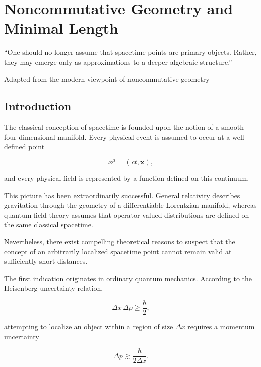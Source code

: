 
\chapter{Noncommutative Geometry and Minimal Length}

\epigraph{
``One should no longer assume that spacetime points are primary objects.
Rather, they may emerge only as approximations to a deeper algebraic
structure.''
}{Adapted from the modern viewpoint of noncommutative geometry}

\label{chap:NCG}


\section{Introduction}

The classical conception of spacetime is founded upon the notion of a smooth
four-dimensional manifold. Every physical event is assumed to occur at a
well-defined point

\[
x^\mu=(ct,\mathbf{x}),
\]

and every physical field is represented by a function defined on this
continuum.

This picture has been extraordinarily successful. General relativity describes
gravitation through the geometry of a differentiable Lorentzian manifold,
whereas quantum field theory assumes that operator-valued distributions are
defined on the same classical spacetime.

Nevertheless, there exist compelling theoretical reasons to suspect that the
concept of an arbitrarily localized spacetime point cannot remain valid at
sufficiently short distances.

The first indication originates in ordinary quantum mechanics.
According to the Heisenberg uncertainty relation,

\begin{equation}
\Delta x\,\Delta p
\ge
\frac{\hbar}{2},
\label{eq:Heisenberg}
\end{equation}

attempting to localize an object within a region of size $\Delta x$ requires
a momentum uncertainty

\begin{equation}
\Delta p
\gtrsim
\frac{\hbar}{2\Delta x}.
\end{equation}

